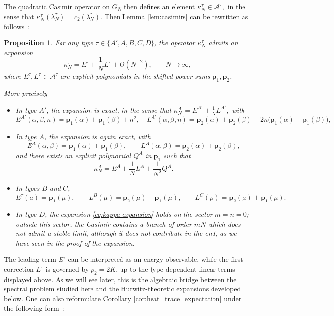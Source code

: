 \documentclass[11pt,a4paper,reqno]{article}
\newtheorem{proposition}[theorem]{Proposition}
\theoremstyle{definition}
\theoremstyle{remark}
\begin{document}
The quadratic Casimir operator on $G_N$ then defines an element $\kappa_N^\tau\in \mathcal A^\tau,$ in the sense that $\kappa_N^\tau(\lambda_N^\tau) = c_2(\lambda_N^\tau).$ Then Lemma \ref{lem:casimirs} can be rewritten as follows~:

\begin{proposition}\label{prop:shifted-casimir}
For any type $\tau\in\{A',A,B,C,D\}$, the operator $\kappa_N^\tau$ admits an expansion
\begin{equation}
\label{eq:kappa-expansion}
\kappa_N^\tau
=
E^\tau+\frac{1}{N}L^\tau+O(N^{-2}),
\qquad N\to\infty,
\end{equation}
where $E^\tau,L^\tau\in \mathcal A^\tau$ are explicit polynomials in the shifted power sums $\mathbf{p}_1,\mathbf{p}_2$.

More precisely

\begin{itemize}
\item In type $A'$,  the expansion is exact, in the sense that $\kappa_N^{A'}=E^{A'}+\frac{1}{N}L^{A'},$  with
\[
E^{A'}(\alpha,\beta,n)=\mathbf{p}_1(\alpha)+\mathbf{p}_1(\beta)+n^2, \quad L^{A'}(\alpha,\beta,n)
=
\mathbf{p}_2(\alpha)+\mathbf{p}_2(\beta)
+2n\bigl(\mathbf{p}_1(\alpha)-\mathbf{p}_1(\beta)\bigr),
\]
\item In type $A$, the expansion is again exact, with
\[
E^{A}(\alpha,\beta)=\mathbf{p}_1(\alpha)+\mathbf{p}_1(\beta),
\qquad
L^{A}(\alpha,\beta)=\mathbf{p}_2(\alpha)+\mathbf{p}_2(\beta),
\]
and there exists an explicit polynomial $Q^A$ in $\mathbf{p}_1$ such that
\[
\kappa_N^{A}
=
E^{A}+\frac{1}{N}L^{A}+\frac{1}{N^2}Q^{A}.
\]

\item In types $B$ and $C$,
\[
E^\tau(\mu)=\mathbf{p}_1(\mu),\qquad
L^{B}(\mu)=\mathbf{p}_2(\mu)-\mathbf{p}_1(\mu),\qquad
L^{C}(\mu)=\mathbf{p}_2(\mu)+\mathbf{p}_1(\mu).
\]
\item In type $D$, the expansion \eqref{eq:kappa-expansion} holds on the sector $m=n=0$; outside this sector, the Casimir contains a branch of order $mN$ which does not admit a stable limit, although it does not contribute in the end, as we have seen in the proof of the expansion.\\
\end{itemize}
\end{proposition}

The leading term $E^\tau$ can be interpreted as an energy observable, while the first correction $L^\tau$ is governed by $p_2=2K$, up to the type-dependent linear terms displayed above. As we will see later, this is the algebraic bridge between the spectral problem studied here and the Hurwitz-theoretic expansions developed below. One can also reformulate Corollary  \ref{cor:heat_trace_expectation} under the following form~:
\end{document}
